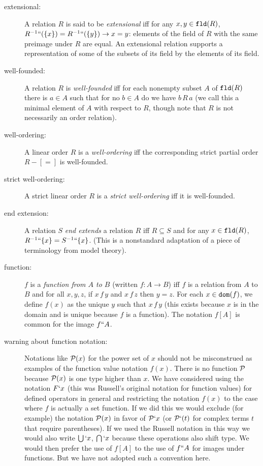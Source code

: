 \documentclass[12pt]{book}
\begin{document}
\begin{description}
\item[extensional:] A relation $R$ is said to be {\em extensional\/}
iff for any $x,y \in {\tt fld}(R)$,
$R^{-1}``(\{x\})=R^{-1}``(\{y\})\rightarrow x=y$: elements of the
field of $R$ with the same preimage under $R$ are equal.  An
extensional relation supports a representation of some of the subsets
of its field by the elements of its field.

\item[well-founded:] A relation $R$ is {\em well-founded\/} iff for each
nonempty subset $A$ of ${\tt fld}(R)$ there is $a\in A$ such that for
no $b\in A$ do we have $b \,R\,a$ (we call this a minimal element of
$A$ with respect to $R$, though note that $R$ is not necessarily an
order relation).

\item[well-ordering:] A linear order $R$ is a {\em well-ordering\/} iff the
corresponding strict partial order $R-[=]$ is well-founded.

\item[strict well-ordering:] A strict linear order $R$ is a {\em strict
well-ordering\/} iff it is well-founded.

\item[end extension:] A relation $S$ {\em end extends\/} a relation $R$
iff $R \subseteq S$ and for any $x \in {\tt fld}(R)$, $R^{-1}``\{x\} =
S^{-1}``\{x\}$.  (This is a nonstandard adaptation of a piece of
terminology from model theory).

\item[function:] $f$ is a {\em function from $A$ to $B$\/} (written
$f:A\rightarrow B$) iff $f$ is a relation from $A$ to $B$ and for all
$x,y,z$, if $x\,f\,y$ and $x\,f\,z$ then $y=z$.  For each $x\in {\tt
dom}(f)$, we define $f(x)$ as the unique $y$ such that $x\,f\,y$ (this
exists because $x$ is in the domain and is unique because $f$ is a
function).  The notation $f[A]$ is common for the image $f``A$.

\item[warning about function notation:] Notations like ${\cal P}(x)$
for the power set of $x$ should not be misconstrued as examples of the
function value notation $f(x)$.  There is no function $\cal P$ because
${\cal P}(x)$ is one type higher than $x$.  We have considered using
the notation $F`x$ (this was Russell's original notation for function
values) for defined operators in general and restricting the notation
$f(x)$ to the case where $f$ is actually a set function.  If we did
this we would exclude (for example) the notation ${\cal P}(x)$ in
favor of ${\cal P}`x$ (or ${\cal P}`(t)$ for complex terms $t$ that
require parentheses).  If we used the Russell notation in this way we
would also write $\bigcup`x$, $\bigcap`x$ because these operations
also shift type.  We would then prefer the use of $f[A]$ to the use of
$f``A$ for images under functions.  But we have not adopted such a
convention here.


\end{description}
\end{document}
